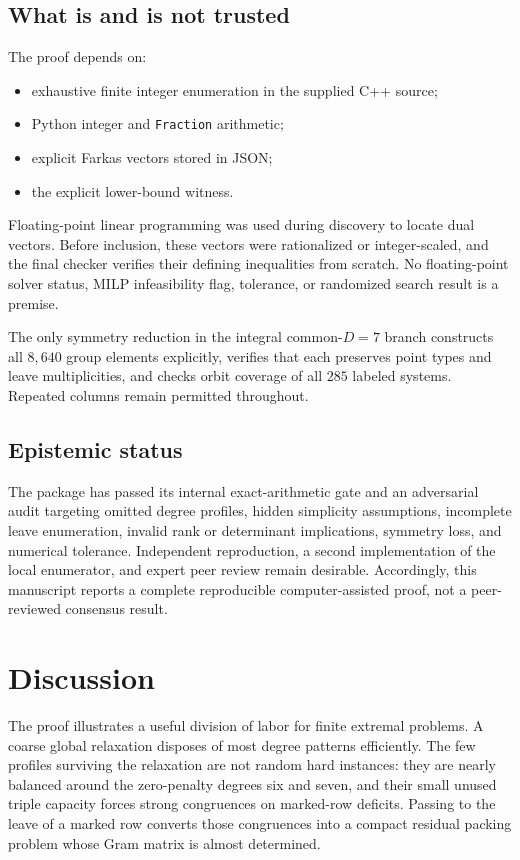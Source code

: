 \documentclass[11pt]{amsart}
\begin{document}
\subsection{What is and is not trusted}
The proof depends on:
\begin{itemize}
\item exhaustive finite integer enumeration in the supplied C++ source;
\item Python integer and \texttt{Fraction} arithmetic;
\item explicit Farkas vectors stored in JSON;
\item the explicit lower-bound witness.
\end{itemize}
Floating-point linear programming was used during discovery to locate dual vectors. Before inclusion, these vectors were rationalized or integer-scaled, and the final checker verifies their defining inequalities from scratch. No floating-point solver status, MILP infeasibility flag, tolerance, or randomized search result is a premise.

The only symmetry reduction in the integral common-$D=7$ branch constructs all $8{,}640$ group elements explicitly, verifies that each preserves point types and leave multiplicities, and checks orbit coverage of all $285$ labeled systems. Repeated columns remain permitted throughout.

\subsection{Epistemic status}
The package has passed its internal exact-arithmetic gate and an adversarial audit targeting omitted degree profiles, hidden simplicity assumptions, incomplete leave enumeration, invalid rank or determinant implications, symmetry loss, and numerical tolerance. Independent reproduction, a second implementation of the local enumerator, and expert peer review remain desirable. Accordingly, this manuscript reports a complete reproducible computer-assisted proof, not a peer-reviewed consensus result.

\section{Discussion}
The proof illustrates a useful division of labor for finite extremal problems. A coarse global relaxation disposes of most degree patterns efficiently. The few profiles surviving the relaxation are not random hard instances: they are nearly balanced around the zero-penalty degrees six and seven, and their small unused triple capacity forces strong congruences on marked-row deficits. Passing to the leave of a marked row converts those congruences into a compact residual packing problem whose Gram matrix is almost determined.
\end{document}

